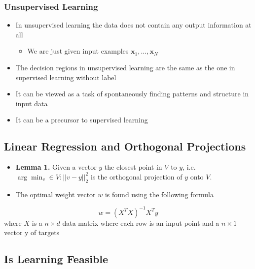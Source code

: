 \documentclass[11pt]{article}
\begin{document}
\subsubsection{Unsupervised Learning}
\label{sec:org7807810}
\begin{itemize}
\item In unsupervised learning the data does not contain any output information at all
\begin{itemize}
\item We are just given input examples \(\pmb x_1, \dots, \pmb x_N\)
\end{itemize}

\item The decision regions in unsupervised learning are the same as the one in supervised learning without label
\item It can be viewed as a task of spontaneously finding patterns and structure in input data
\item It can be a precursor to supervised learning
\end{itemize}

\subsection{Linear Regression and Orthogonal Projections}
\label{sec:orge63d1b1}
\begin{itemize}
\item \textbf{Lemma 1.} Given a vector \(y\) the closest point in \(V\) to \(y\), i.e. \(\arg\min_v \in V : ||v-y||_2^2\)  is the orthogonal projection of \(y\) onto \(V\).
\item The optimal weight vector \(w\) is found using the following formula
\end{itemize}
\begin{equation}
  w = (X^TX)^{-1}X^Ty
\end{equation}
where \(X\) is a \(n \times d\) data matrix where each row is an input point and a \(n \times 1\) vector y of targets

\subsection{Is Learning Feasible}
\label{sec:org4a80f7c}
\end{document}
